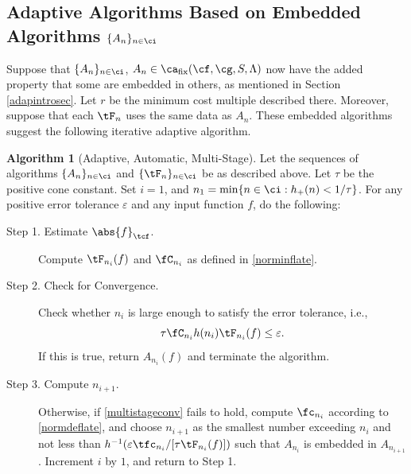 \documentclass[]{elsarticle}
\DeclareMathOperator{\fix}{fix}
\theoremstyle{definition}
\newtheorem{algo}{Algorithm}
\theoremstyle{remark}
\newcommand{\Ftnorm}[1]{\abs{#1}_{\tcf}}
\begin{document}
\subsection{Adaptive Algorithms Based on Embedded Algorithms $\{A_n\}_{n \in \ci}$}

Suppose that $\{A_n\}_{n \in \ci}$, $A_n  \in \ca_{\fix}(\cf,\cg,S,\Lambda)$ now have the added property that some are embedded in others, as mentioned in Section \ref{adapintrosec}.  Let $r$ be the minimum cost multiple described there.  Moreover, suppose that each $\tF_n$ uses the same data as $A_n$. These embedded algorithms suggest the following iterative adaptive algorithm.

\begin{algo}[Adaptive, Automatic, Multi-Stage] \label{multistagealgo}  Let the sequences of algorithms $\{A_n\}_{n \in \ci}$ and  $\{\tF_n\}_{n \in \ci}$ be as described above.  Let $\tau$ be the positive cone constant. Set $i=1$, and $n_1 = \min\{ n \in \ci : h_+(n) < 1/\tau\}$. For any positive error tolerance $\varepsilon$ and any input function $f$, do the following:
\begin{description}

\item [Step 1. Estimate $\Ftnorm{f}$.] Compute $\tF_{n_i}(f)$ and $\fC_{n_i}$ as defined in \eqref{norminflate}.  

\item [Step 2. Check for Convergence.] Check whether $n_i$ is large enough to satisfy the error tolerance, i.e., 
\begin{equation} \label{multistageconv}
\tau \fC_{n_i} h(n_i)\tF_{n_i}(f) \le \varepsilon.
\end{equation}
If this is true, return $A_{n_i}(f)$ and terminate the algorithm.

\item[Step 3. Compute $n_{i+1}$.]  Otherwise, if \eqref{multistageconv} fails to hold, compute $\fc_{n_i}$ according to \eqref{normdeflate}, and choose $n_{i+1}$ as the smallest number exceeding $n_i$ and not less than $h^{-1}(\varepsilon \tfc_{n_i}/[\tau \tF_{n_i}(f)])$ such that $A_{n_{i}}$ is embedded in $A_{n_{i+1}}$. Increment $i$ by $1$, and return to Step 1.  

\end{description}  
\end{algo}
\end{document}
